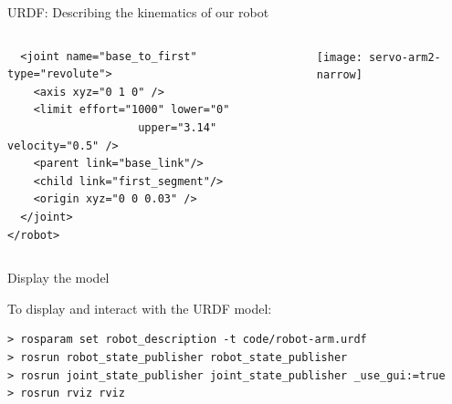 \documentclass[compress]{beamer}
\begin{document}
\begin{frame}[fragile]{URDF: Describing the kinematics of our robot}
\begin{columns}
\begin{column}{0.5\linewidth}
\begin{overprint}
\begin{verbatim}
  <joint name="base_to_first" type="revolute">
    <axis xyz="0 1 0" />
    <limit effort="1000" lower="0"
                    upper="3.14" velocity="0.5" />
    <parent link="base_link"/>
    <child link="first_segment"/>
    <origin xyz="0 0 0.03" />
  </joint>
</robot>
\end{verbatim}

    \end{overprint}
        \end{column}
        \begin{column}{0.5\linewidth}
            \begin{center}
                \texttt{[image: servo-arm2-narrow]}
            \end{center}
        \end{column}
    \end{columns}
\end{frame}


\begin{frame}[fragile]{Display the model}

    To display and interact with the URDF model:

    \begin{verbatim}
> rosparam set robot_description -t code/robot-arm.urdf
> rosrun robot_state_publisher robot_state_publisher
> rosrun joint_state_publisher joint_state_publisher _use_gui:=true
> rosrun rviz rviz
\end{verbatim}
\end{frame}

\end{document}
